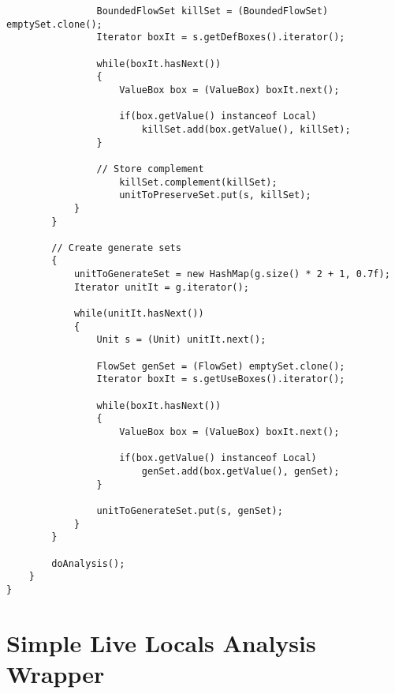 \documentclass{article}
\begin{document}
\begin{verbatim}
                BoundedFlowSet killSet = (BoundedFlowSet) emptySet.clone();
                Iterator boxIt = s.getDefBoxes().iterator();

                while(boxIt.hasNext())
                {
                    ValueBox box = (ValueBox) boxIt.next();

                    if(box.getValue() instanceof Local)
                        killSet.add(box.getValue(), killSet);
                }

                // Store complement
                    killSet.complement(killSet);
                    unitToPreserveSet.put(s, killSet);
            }
        }

        // Create generate sets
        {
            unitToGenerateSet = new HashMap(g.size() * 2 + 1, 0.7f);
            Iterator unitIt = g.iterator();

            while(unitIt.hasNext())
            {
                Unit s = (Unit) unitIt.next();

                FlowSet genSet = (FlowSet) emptySet.clone();
                Iterator boxIt = s.getUseBoxes().iterator();

                while(boxIt.hasNext())
                {
                    ValueBox box = (ValueBox) boxIt.next();

                    if(box.getValue() instanceof Local)
                        genSet.add(box.getValue(), genSet);
                }

                unitToGenerateSet.put(s, genSet);
            }
        }

        doAnalysis();
    }
}
\end{verbatim}

\section{Simple Live Locals Analysis Wrapper}
\label{simpleAnalysisWrapper}
\end{document}
